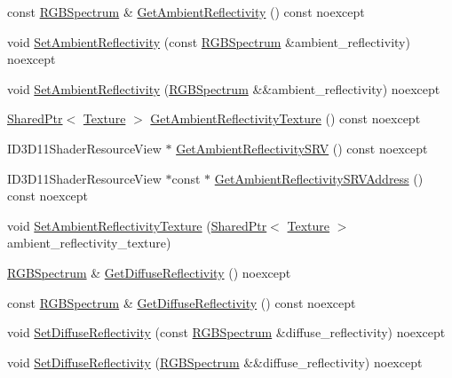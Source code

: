 \begin{DoxyCompactItemize}
const \hyperlink{structmage_1_1_r_g_b_spectrum}{R\+G\+B\+Spectrum} \& \hyperlink{structmage_1_1_shaded_material_a4bb3403853e4d6ee9e443e575b33a755}{Get\+Ambient\+Reflectivity} () const noexcept
\item 
void \hyperlink{structmage_1_1_shaded_material_a542065e25a35759da1c2a8d4ebd81024}{Set\+Ambient\+Reflectivity} (const \hyperlink{structmage_1_1_r_g_b_spectrum}{R\+G\+B\+Spectrum} \&ambient\+\_\+reflectivity) noexcept
\item 
void \hyperlink{structmage_1_1_shaded_material_ab5752da022e7e7e91e92ec539148ea4d}{Set\+Ambient\+Reflectivity} (\hyperlink{structmage_1_1_r_g_b_spectrum}{R\+G\+B\+Spectrum} \&\&ambient\+\_\+reflectivity) noexcept
\item 
\hyperlink{namespacemage_a1e01ae66713838a7a67d30e44c67703e}{Shared\+Ptr}$<$ \hyperlink{classmage_1_1_texture}{Texture} $>$ \hyperlink{structmage_1_1_shaded_material_a66be8b4fbb028b41483f8a9e044e5023}{Get\+Ambient\+Reflectivity\+Texture} () const noexcept
\item 
I\+D3\+D11\+Shader\+Resource\+View $\ast$ \hyperlink{structmage_1_1_shaded_material_ae5e18984deccbd70ec76709e417b949f}{Get\+Ambient\+Reflectivity\+S\+RV} () const noexcept
\item 
I\+D3\+D11\+Shader\+Resource\+View $\ast$const  $\ast$ \hyperlink{structmage_1_1_shaded_material_a854b166ed33ab748910d98a0ea6bd4d1}{Get\+Ambient\+Reflectivity\+S\+R\+V\+Address} () const noexcept
\item 
void \hyperlink{structmage_1_1_shaded_material_aacf12d6f3ed2b55c90366790345c6fd6}{Set\+Ambient\+Reflectivity\+Texture} (\hyperlink{namespacemage_a1e01ae66713838a7a67d30e44c67703e}{Shared\+Ptr}$<$ \hyperlink{classmage_1_1_texture}{Texture} $>$ ambient\+\_\+reflectivity\+\_\+texture)
\item 
\hyperlink{structmage_1_1_r_g_b_spectrum}{R\+G\+B\+Spectrum} \& \hyperlink{structmage_1_1_shaded_material_a3e292664418846588d1e5cdc9ddc8ab5}{Get\+Diffuse\+Reflectivity} () noexcept
\item 
const \hyperlink{structmage_1_1_r_g_b_spectrum}{R\+G\+B\+Spectrum} \& \hyperlink{structmage_1_1_shaded_material_ae2c5d441c51b40a3c940785a002f59ec}{Get\+Diffuse\+Reflectivity} () const noexcept
\item 
void \hyperlink{structmage_1_1_shaded_material_a2da4b314ab2f92659cbed167cc1f32c9}{Set\+Diffuse\+Reflectivity} (const \hyperlink{structmage_1_1_r_g_b_spectrum}{R\+G\+B\+Spectrum} \&diffuse\+\_\+reflectivity) noexcept
\item 
void \hyperlink{structmage_1_1_shaded_material_a672e0afafbad1280c97d2ad909b320c8}{Set\+Diffuse\+Reflectivity} (\hyperlink{structmage_1_1_r_g_b_spectrum}{R\+G\+B\+Spectrum} \&\&diffuse\+\_\+reflectivity) noexcept

\end{DoxyCompactItemize}
